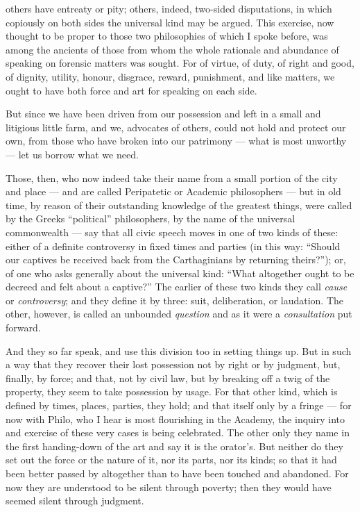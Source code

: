  others have entreaty or pity; others, indeed, two-sided disputations, in which copiously on both sides the universal kind may be argued. This exercise, now thought to be proper to those two philosophies of which I spoke before, was among the ancients of those from whom the whole rationale and abundance of speaking on forensic matters was sought. For of virtue, of duty, of right and good, of dignity, utility, honour, disgrace, reward, punishment, and like matters, we ought to have both force and art for speaking on each side.

 But since we have been driven from our possession and left in a small and litigious little farm, and we, advocates of others, could not hold and protect our own, from those who have broken into our patrimony — what is most unworthy — let us borrow what we need.

 Those, then, who now indeed take their name from a small portion of the city and place — and are called Peripatetic or Academic philosophers — but in old time, by reason of their outstanding knowledge of the greatest things, were called by the Greeks ``political'' philosophers, by the name of the universal commonwealth — say that all civic speech moves in one of two kinds of these: either of a definite controversy in fixed times and parties (in this way: ``Should our captives be received back from the Carthaginians by returning theirs?''); or, of one who asks generally about the universal kind: ``What altogether ought to be decreed and felt about a captive?'' The earlier of these two kinds they call \textit{cause} or \textit{controversy}; and they define it by three: suit, deliberation, or laudation. The other, however, is called an unbounded \textit{question} and as it were a \textit{consultation} put forward.

 And they so far speak, and use this division too in setting things up. But in such a way that they recover their lost possession not by right or by judgment, but, finally, by force; and that, not by civil law, but by breaking off a twig of the property, they seem to take possession by usage. For that other kind, which is defined by times, places, parties, they hold; and that itself only by a fringe — for now with Philo, who I hear is most flourishing in the Academy, the inquiry into and exercise of these very cases is being celebrated. The other only they name in the first handing-down of the art and say it is the orator's. But neither do they set out the force or the nature of it, nor its parts, nor its kinds; so that it had been better passed by altogether than to have been touched and abandoned. For now they are understood to be silent through poverty; then they would have seemed silent through judgment.

